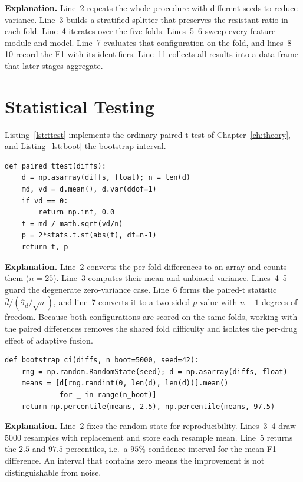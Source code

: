 \documentclass[../main.tex]{subfiles}
\begin{document}
\noindent\textbf{Explanation.} Line~2 repeats the whole procedure with different seeds to reduce variance. Line~3 builds a stratified splitter that preserves the resistant ratio in each fold. Line~4 iterates over the five folds. Lines~5--6 sweep every feature module and model. Line~7 evaluates that configuration on the fold, and lines~8--10 record the F1 with its identifiers. Line~11 collects all results into a data frame that later stages aggregate.

\section{Statistical Testing}

Listing~\ref{lst:ttest} implements the ordinary paired t-test of Chapter~\ref{ch:theory}, and Listing~\ref{lst:boot} the bootstrap interval.

\begin{lstlisting}[caption={Ordinary paired t-test on the per-fold F1 differences.},label=lst:ttest]
def paired_ttest(diffs):
    d = np.asarray(diffs, float); n = len(d)
    md, vd = d.mean(), d.var(ddof=1)
    if vd == 0:
        return np.inf, 0.0
    t = md / math.sqrt(vd/n)
    p = 2*stats.t.sf(abs(t), df=n-1)
    return t, p
\end{lstlisting}

\noindent\textbf{Explanation.} Line~2 converts the per-fold differences to an array and counts them ($n=25$). Line~3 computes their mean and unbiased variance. Lines~4--5 guard the degenerate zero-variance case. Line~6 forms the paired-t statistic $\bar{d}/(\hat{\sigma}_d/\sqrt{n})$, and line~7 converts it to a two-sided $p$-value with $n-1$ degrees of freedom. Because both configurations are scored on the same folds, working with the paired differences removes the shared fold difficulty and isolates the per-drug effect of adaptive fusion.

\begin{lstlisting}[caption={Bootstrap confidence interval for the mean difference.},label=lst:boot]
def bootstrap_ci(diffs, n_boot=5000, seed=42):
    rng = np.random.RandomState(seed); d = np.asarray(diffs, float)
    means = [d[rng.randint(0, len(d), len(d))].mean()
             for _ in range(n_boot)]
    return np.percentile(means, 2.5), np.percentile(means, 97.5)
\end{lstlisting}

\noindent\textbf{Explanation.} Line~2 fixes the random state for reproducibility. Lines~3--4 draw $5000$ resamples with replacement and store each resample mean. Line~5 returns the $2.5$ and $97.5$ percentiles, i.e.\ a $95\%$ confidence interval for the mean F1 difference. An interval that contains zero means the improvement is not distinguishable from noise.
\end{document}
